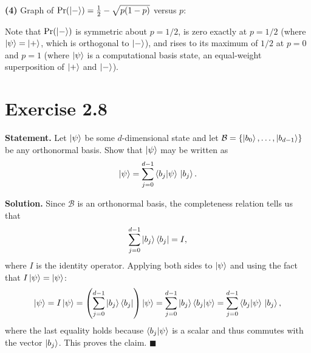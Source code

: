 \documentclass[11pt]{article}
\begin{document}
\textbf{(4)} Graph of $\Pr(\ket{-}) = \tfrac{1}{2} - \sqrt{p(1-p)}$ versus $p$:
\begin{center}
\end{center}
Note that $\Pr(\ket{-})$ is symmetric about $p = 1/2$, is zero exactly at $p = 1/2$ (where $\ket{\psi} = \ket{+}$, which is orthogonal to $\ket{-}$), and rises to its maximum of $1/2$ at $p = 0$ and $p = 1$ (where $\ket{\psi}$ is a computational basis state, an equal-weight superposition of $\ket{+}$ and $\ket{-}$).

\section*{Exercise 2.8}
\textbf{Statement.} Let $\ket{\psi}$ be some $d$-dimensional state and let $\mathcal{B} = \{\ket{b_0}, \dots, \ket{b_{d-1}}\}$ be any orthonormal basis. Show that $\ket{\psi}$ may be written as
\[
\ket{\psi} = \sum_{j=0}^{d-1} \braket{b_j|\psi}\,\ket{b_j}.
\]

\textbf{Solution.} Since $\mathcal{B}$ is an orthonormal basis, the completeness relation tells us that
\[
\sum_{j=0}^{d-1} \ket{b_j}\bra{b_j} = I,
\]
where $I$ is the identity operator. Applying both sides to $\ket{\psi}$ and using the fact that $I\ket{\psi} = \ket{\psi}$:
\[
\ket{\psi} = I\ket{\psi} = \left(\sum_{j=0}^{d-1} \ket{b_j}\bra{b_j}\right)\ket{\psi} = \sum_{j=0}^{d-1} \ket{b_j}\braket{b_j|\psi} = \sum_{j=0}^{d-1} \braket{b_j|\psi}\,\ket{b_j},
\]
where the last equality holds because $\braket{b_j|\psi}$ is a scalar and thus commutes with the vector $\ket{b_j}$. This proves the claim. $\blacksquare$
\end{document}
